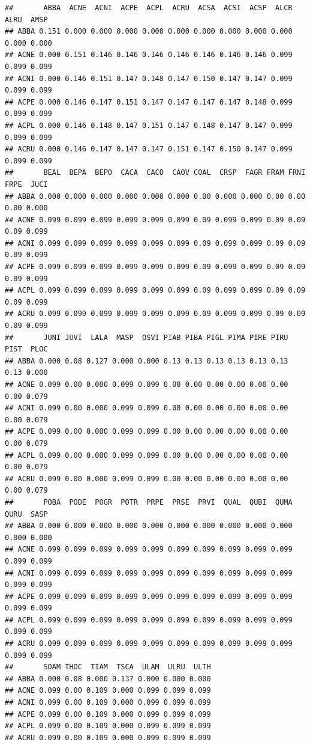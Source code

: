 \documentclass[
]{book}
\begin{document}
\begin{verbatim}
##       ABBA  ACNE  ACNI  ACPE  ACPL  ACRU  ACSA  ACSI  ACSP  ALCR  ALRU  AMSP
## ABBA 0.151 0.000 0.000 0.000 0.000 0.000 0.000 0.000 0.000 0.000 0.000 0.000
## ACNE 0.000 0.151 0.146 0.146 0.146 0.146 0.146 0.146 0.146 0.099 0.099 0.099
## ACNI 0.000 0.146 0.151 0.147 0.148 0.147 0.150 0.147 0.147 0.099 0.099 0.099
## ACPE 0.000 0.146 0.147 0.151 0.147 0.147 0.147 0.147 0.148 0.099 0.099 0.099
## ACPL 0.000 0.146 0.148 0.147 0.151 0.147 0.148 0.147 0.147 0.099 0.099 0.099
## ACRU 0.000 0.146 0.147 0.147 0.147 0.151 0.147 0.150 0.147 0.099 0.099 0.099
##       BEAL  BEPA  BEPO  CACA  CACO  CAOV COAL  CRSP  FAGR FRAM FRNI FRPE  JUCI
## ABBA 0.000 0.000 0.000 0.000 0.000 0.000 0.00 0.000 0.000 0.00 0.00 0.00 0.000
## ACNE 0.099 0.099 0.099 0.099 0.099 0.099 0.09 0.099 0.099 0.09 0.09 0.09 0.099
## ACNI 0.099 0.099 0.099 0.099 0.099 0.099 0.09 0.099 0.099 0.09 0.09 0.09 0.099
## ACPE 0.099 0.099 0.099 0.099 0.099 0.099 0.09 0.099 0.099 0.09 0.09 0.09 0.099
## ACPL 0.099 0.099 0.099 0.099 0.099 0.099 0.09 0.099 0.099 0.09 0.09 0.09 0.099
## ACRU 0.099 0.099 0.099 0.099 0.099 0.099 0.09 0.099 0.099 0.09 0.09 0.09 0.099
##       JUNI JUVI  LALA  MASP  OSVI PIAB PIBA PIGL PIMA PIRE PIRU PIST  PLOC
## ABBA 0.000 0.08 0.127 0.000 0.000 0.13 0.13 0.13 0.13 0.13 0.13 0.13 0.000
## ACNE 0.099 0.00 0.000 0.099 0.099 0.00 0.00 0.00 0.00 0.00 0.00 0.00 0.079
## ACNI 0.099 0.00 0.000 0.099 0.099 0.00 0.00 0.00 0.00 0.00 0.00 0.00 0.079
## ACPE 0.099 0.00 0.000 0.099 0.099 0.00 0.00 0.00 0.00 0.00 0.00 0.00 0.079
## ACPL 0.099 0.00 0.000 0.099 0.099 0.00 0.00 0.00 0.00 0.00 0.00 0.00 0.079
## ACRU 0.099 0.00 0.000 0.099 0.099 0.00 0.00 0.00 0.00 0.00 0.00 0.00 0.079
##       POBA  PODE  POGR  POTR  PRPE  PRSE  PRVI  QUAL  QUBI  QUMA  QURU  SASP
## ABBA 0.000 0.000 0.000 0.000 0.000 0.000 0.000 0.000 0.000 0.000 0.000 0.000
## ACNE 0.099 0.099 0.099 0.099 0.099 0.099 0.099 0.099 0.099 0.099 0.099 0.099
## ACNI 0.099 0.099 0.099 0.099 0.099 0.099 0.099 0.099 0.099 0.099 0.099 0.099
## ACPE 0.099 0.099 0.099 0.099 0.099 0.099 0.099 0.099 0.099 0.099 0.099 0.099
## ACPL 0.099 0.099 0.099 0.099 0.099 0.099 0.099 0.099 0.099 0.099 0.099 0.099
## ACRU 0.099 0.099 0.099 0.099 0.099 0.099 0.099 0.099 0.099 0.099 0.099 0.099
##       SOAM THOC  TIAM  TSCA  ULAM  ULRU  ULTH
## ABBA 0.000 0.08 0.000 0.137 0.000 0.000 0.000
## ACNE 0.099 0.00 0.109 0.000 0.099 0.099 0.099
## ACNI 0.099 0.00 0.109 0.000 0.099 0.099 0.099
## ACPE 0.099 0.00 0.109 0.000 0.099 0.099 0.099
## ACPL 0.099 0.00 0.109 0.000 0.099 0.099 0.099
## ACRU 0.099 0.00 0.109 0.000 0.099 0.099 0.099
\end{verbatim}
\end{document}
